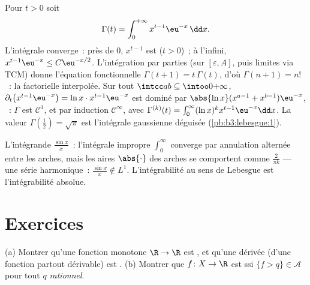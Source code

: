 \begin{example}\label{ex:b3:lebesgue:gamma}
Pour $t > 0$ soit
\[
\Gamma(t) = \int_0^{+\infty} x^{t-1}\eu^{-x}\,\dd x .
\]
L'intégrale converge~: près de $0$, $x^{t-1}$ est
 ($t > 0$)~; à l'infini, $x^{t-1}\eu^{-x} \leq
C\eu^{-x/2}$. L'intégration par parties (sur
$[\varepsilon, A]$, puis limites via TCM) donne l'équation
fonctionnelle $\Gamma(t + 1) = t\,\Gamma(t)$, d'où
$\Gamma(n+1) = n!$~: la factorielle interpolée. Sur tout
$\intcc ab \subseteq \intoo0{+\infty}$,
$\partial_t\bigl(x^{t-1}\eu^{-x}\bigr) = \ln
x\cdot x^{t-1}\eu^{-x}$ est dominé par $\abs{\ln
x}(x^{a-1} + x^{b-1})\eu^{-x}$, ~: $\Gamma$ est
$\mathcal C^1$, et par induction $\mathcal C^\infty$, avec
$\Gamma^{(k)}(t) =
\int_0^\infty(\ln x)^kx^{t-1}\eu^{-x}\dd x$. La valeur
$\Gamma(\frac12) = \sqrt\pi$ est l'intégrale gaussienne
déguisée (\cref{pb:b3:lebesgue:1}).
\end{example}

\begin{omfigure}

{\small L'intégrande $\frac{\sin x}x$~: l'intégrale impropre
$\int_0^\infty$ converge par annulation alternée entre les
arches, mais les aires $\abs{\cdot}$ des arches se
comportent comme $\frac2{\pi k}$ --- une série harmonique~:
$\frac{\sin x}x \notin L^1$. L'intégrabilité au sens de
Lebesgue est l'intégrabilité absolue.}
\end{omfigure}

\section{Exercices}

\begin{exercise}[$\star$]\label{exo:b3:lebesgue:1}
(a) Montrer qu'une fonction monotone $\R \to \R$ est
, et qu'une dérivée (d'une fonction partout
dérivable) est .
(b) Montrer que $f \colon X \to \R$ est  ssi $\{f
> q\} \in \mathcal A$ pour tout $q$ \emph{rationnel}.
\end{exercise}

